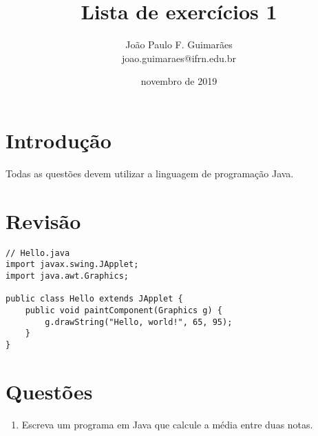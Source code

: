 \documentclass[12pt]{article}
\begin{document}
 

\title{Lista de exercícios 1} 
\author{João Paulo F. Guimarães \\ joao.guimaraes@ifrn.edu.br} 
\date{novembro de 2019} 

\maketitle %

\section{Introdução}

Todas as questões devem utilizar a linguagem de programação Java.

\section{Revisão}

\begin{lstlisting}
// Hello.java
import javax.swing.JApplet;
import java.awt.Graphics;

public class Hello extends JApplet {
    public void paintComponent(Graphics g) {
        g.drawString("Hello, world!", 65, 95);
    }    
}
\end{lstlisting}


\section{Questões}

\begin{enumerate}

	\item Escreva um programa em Java que calcule a média entre duas notas.



\end{enumerate}




\end{document}
